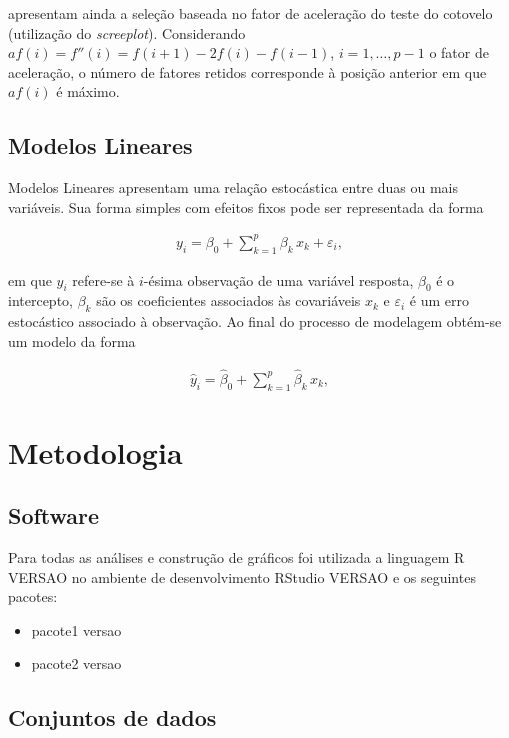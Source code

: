 \documentclass[12pt, a4paper, twoside]{report}
\numberwithin{equation}{subsection} %
\begin{document}
\cite{morettindatasci} apresentam ainda a seleção baseada no fator de aceleração do teste do cotovelo (utilização do \textit{screeplot}). Considerando $af(i) = f''(i) = f(i+1) - 2f(i) - f(i-1)$, $i = 1, \dots, p-1$ o fator de aceleração, o número de fatores retidos corresponde à posição anterior em que $af(i)$ é máximo.



\section{Modelos Lineares}

Modelos Lineares apresentam uma relação estocástica entre duas ou mais variáveis. Sua forma simples com efeitos fixos pode ser representada da forma

\begin{align}
	y_i = \beta_0 + \sum\limits_{k = 1}^{p} \beta_k \, x_{k} + \varepsilon_i, \label{relacao_linear_basica}
\end{align}

\noindent em que $y_i$ refere-se à $i$-ésima observação de uma variável resposta, $\beta_0$ é o intercepto, $\beta_k$ são os coeficientes associados às covariáveis $x_{k}$ e $\varepsilon_i$ é um erro estocástico associado à observação. Ao final do processo de modelagem obtém-se um modelo da forma

\begin{align}
	\hat{y}_i = \hat{\beta}_0 + \sum\limits_{k = 1}^{p} \hat{\beta}_k \, x_{k}, \label{modelo_linear_basico}
\end{align}

\chapter{Metodologia}

\section{Software}

Para todas as análises e construção de gráficos foi utilizada a linguagem R VERSAO no ambiente de desenvolvimento RStudio VERSAO e os seguintes pacotes:

\begin{itemize}
	\item pacote1 versao
	\item pacote2 versao
\end{itemize}

\section{Conjuntos de dados}
\end{document}
